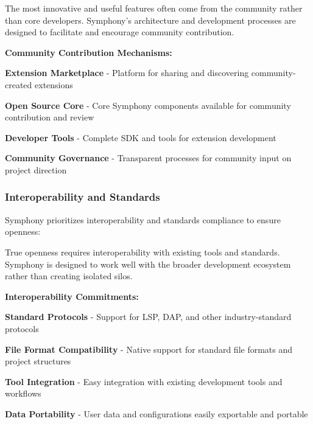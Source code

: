 \begin{successbox}
The most innovative and useful features often come from the community rather than core developers. Symphony's architecture and development processes are designed to facilitate and encourage community contribution.
\end{successbox}

\textbf{Community Contribution Mechanisms:}

\begin{expandedlist}
    \item \textbf{Extension Marketplace} - Platform for sharing and discovering community-created extensions
    
    \item \textbf{Open Source Core} - Core Symphony components available for community contribution and review
    
    \item \textbf{Developer Tools} - Complete SDK and tools for extension development
    
    \item \textbf{Community Governance} - Transparent processes for community input on project direction
\end{expandedlist}

\subsubsection{Interoperability and Standards}

Symphony prioritizes interoperability and standards compliance to ensure openness:

\begin{alertbox}
True openness requires interoperability with existing tools and standards. Symphony is designed to work well with the broader development ecosystem rather than creating isolated silos.
\end{alertbox}

\textbf{Interoperability Commitments:}

\begin{compactlist}
    \item \textbf{Standard Protocols} - Support for LSP, DAP, and other industry-standard protocols
    \item \textbf{File Format Compatibility} - Native support for standard file formats and project structures
    \item \textbf{Tool Integration} - Easy integration with existing development tools and workflows
    \item \textbf{Data Portability} - User data and configurations easily exportable and portable
\end{compactlist}

